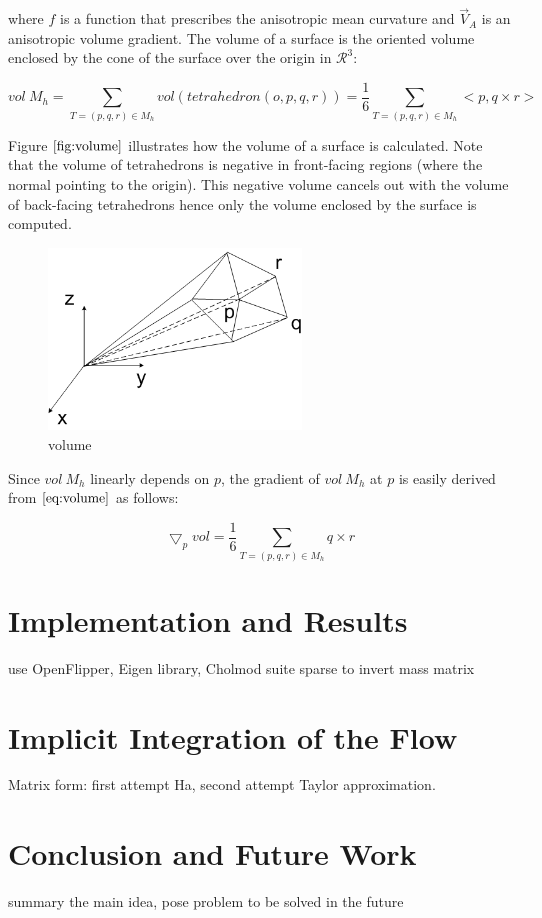 \documentclass[11pt]{article}
\begin{document}
where $f$ is a function that prescribes the anisotropic mean curvature and $\vec{V}_A$ is an anisotropic volume gradient. The volume of a surface is the oriented volume enclosed by the cone of the surface over the origin in $\mathcal{R}^3$:

\begin{equation}
vol \ M_h = \sum\limits_{T=(p, q, r) \in M_h}vol(tetrahedron(o, p, q, r)) = \frac{1}{6}\sum\limits_{T=(p, q, r) \in M_h}<p, q \times r>
\label{eq:volume}
\end{equation}

Figure $\ref{fig:volume}$ illustrates how the volume of a surface is calculated. Note that the volume of tetrahedrons is negative in front-facing regions (where the normal pointing to the origin). This negative volume cancels out with the volume of back-facing tetrahedrons hence only the volume enclosed by the surface is computed.

\begin{figure}[htb]
\centering
\includegraphics[width=0.6\textwidth]{volume.png}
\caption{volume}
\label{fig:volume}
\end{figure}

Since $vol \ M_h$ linearly depends on $p$, the gradient of $vol \ M_h$ at $p$ is easily derived from $\ref{eq:volume}$ as follows:

\begin{equation}
\bigtriangledown_p vol = \frac{1}{6}\sum\limits_{T=(p, q, r) \in M_h}q \times r
\end{equation}



\section{Implementation and Results}

use OpenFlipper, Eigen library, Cholmod suite sparse to invert mass matrix

\section{Implicit Integration of the Flow}

Matrix form: first attempt Ha, second attempt Taylor approximation.

\section{Conclusion and Future Work}

summary the main idea, pose problem to be solved in the future

\end{document}
